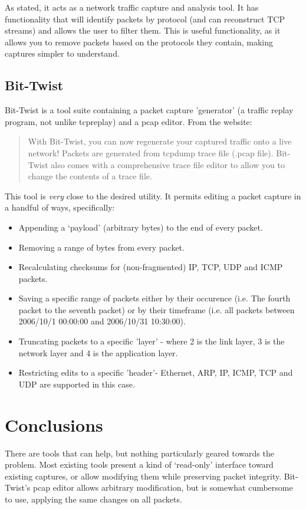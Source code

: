 \documentclass[10pt,a4paper,notitlepage]{report}
\begin{document}
As stated, it acts as a network traffic capture and analysis tool. It has functionality that will identify packets by protocol (and can reconstruct TCP streams) and allows the user to filter them. This is useful functionality, as it allows you to remove packets based on the protocols they contain, making captures simpler to understand.

\subsection{Bit-Twist}
Bit-Twist is a tool suite containing a packet capture 'generator' (a traffic replay program, not unlike tcpreplay\cite{tcpreplay-web}) and a pcap editor.
From the website\cite{bittwist-web}:

\begin{quote}
With Bit-Twist, you can now regenerate your captured traffic onto a live network! Packets are generated from tcpdump trace file (.pcap file). Bit-Twist also comes with a comprehensive trace file editor to allow you to change the contents of a trace file.
\end{quote}

This tool is \emph{very} close to the desired utility. It permits editing a packet capture in a handful of ways, specifically:
\begin{itemize}
\item Appending a `payload' (arbitrary bytes) to the end of every packet.
\item Removing a range of bytes from every packet.
\item Recalculating checksums for (non-fragmented) IP, TCP, UDP and ICMP packets.
\item Saving a specific range of packets either by their occurence (i.e. The fourth packet to the seventh packet) or by their timeframe (i.e. all packets between 2006/10/1 00:00:00 and 2006/10/31 10:30:00).
\item Truncating packets to a specific 'layer' - where 2 is the link layer, 3 is the network layer and 4 is the application layer.
\item Restricting edits to a specific 'header'- Ethernet, ARP, IP, ICMP, TCP and UDP are supported in this case.
\end{itemize}

\section{Conclusions}
There are tools that can help, but nothing particularly geared towards the problem. Most existing tools present a kind of `read-only' interface toward existing captures, or allow modifying them while preserving packet integrity. Bit-Twist's pcap editor allows arbitrary modification, but is somewhat cumbersome to use, applying the same changes on all packets.
\end{document}
